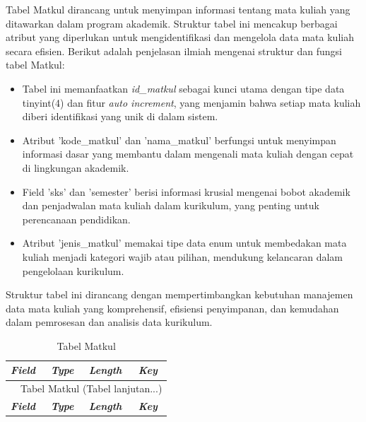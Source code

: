 \begin{enumerate}
	      Tabel Matkul dirancang untuk menyimpan informasi tentang mata kuliah yang ditawarkan dalam program akademik. Struktur tabel ini mencakup berbagai atribut yang diperlukan untuk mengidentifikasi dan mengelola data mata kuliah secara efisien. Berikut adalah penjelasan ilmiah mengenai struktur dan fungsi tabel Matkul:

	      \begin{itemize}
		      \item Tabel ini memanfaatkan \textit{id\_matkul} sebagai kunci utama dengan tipe data tinyint(4) dan fitur \textit{auto increment}, yang menjamin bahwa setiap mata kuliah diberi identifikasi yang unik di dalam sistem.
		      \item Atribut 'kode\_matkul' dan 'nama\_matkul' berfungsi untuk menyimpan informasi dasar yang membantu dalam mengenali mata kuliah dengan cepat di lingkungan akademik.
		      \item Field 'sks' dan 'semester' berisi informasi krusial mengenai bobot akademik dan penjadwalan mata kuliah dalam kurikulum, yang penting untuk perencanaan pendidikan.
		      \item Atribut 'jenis\_matkul' memakai tipe data enum untuk membedakan mata kuliah menjadi kategori wajib atau pilihan, mendukung kelancaran dalam pengelolaan kurikulum.
	      \end{itemize}

	      Struktur tabel ini dirancang dengan mempertimbangkan kebutuhan manajemen data mata kuliah yang komprehensif, efisiensi penyimpanan, dan kemudahan dalam pemrosesan dan analisis data kurikulum.

		      {
			      \fontsize{10}{12}\selectfont
			      \begin{longtable}{l l l l}
				      \caption{Tabel Matkul}
				      \label{admin}                                                                                       \\
				      \hline
				      \textbf{\textit{Field}} & \textbf{\textit{Type}} & \textbf{\textit{Length}} & \textbf{\textit{Key}} \\
				      \hline
				      \endfirsthead

				      \multicolumn{4}{c}{\tablename\ \thetable\ {Tabel Matkul} \space (Tabel lanjutan...)}                \\
				      \hline
				      \textbf{\textit{Field}} & \textbf{\textit{Type}} & \textbf{\textit{Length}} & \textbf{\textit{Key}} \\
				      \hline
				      \endhead


\end{longtable}}
\end{enumerate}
